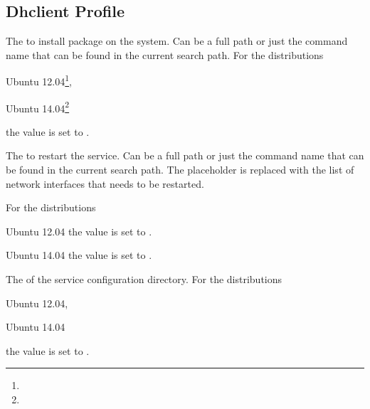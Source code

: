 \label{sec:dhclient_profile}
\subsection{Dhclient Profile}


The  to install package on the system. Can be a full path or
just the command name that can be found in the current search path. 
For the distributions
\begin{inparaitem}
\item[\TheDistribution{ubuntu}] Ubuntu 12.04\footnote{\TheUbuntuPreciseLTSDate},
\item[\TheDistribution{ubuntu}] Ubuntu 14.04\footnote{\TheUbuntuTrustyLTSDate}
\end{inparaitem}
the value is set to .


The  to restart the service. Can be a full path or
just the command name that can be found in the current search path. 
The placeholder  is replaced with the list of network
interfaces that needs to be restarted.

For the distributions
\begin{inparaitem}
\item[\TheDistribution{ubuntu}] Ubuntu 12.04
the value is set to .
\end{inparaitem}
\begin{inparaitem}
\item[\TheDistribution{ubuntu}] Ubuntu 14.04
the value is set to .
\end{inparaitem}


The  of the service configuration directory. 
For the distributions
\begin{inparaitem}
\item[\TheDistribution{ubuntu}] Ubuntu 12.04,
\item[\TheDistribution{ubuntu}] Ubuntu 14.04
\end{inparaitem}
the value is set to .

